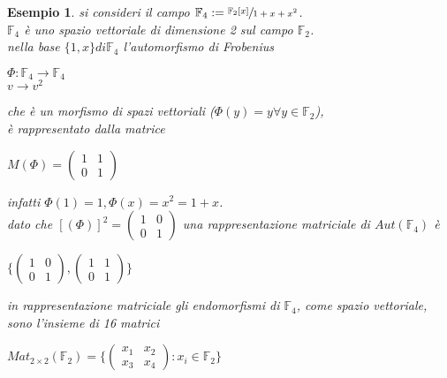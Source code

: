 \documentclass[a4paper,12pt]{article}
\theoremstyle{def}
\theoremstyle{prop}
\theoremstyle{esempio}
\newtheorem*{example}{Esempio}
\theoremstyle{dimostrazione}
\theoremstyle{teo}
\theoremstyle{osservazione}
\begin{document}
\newpage
\begin{example}
	si consideri il campo \(\mathbb{F}_4 := \sfrac{\mathbb{F}_2[x]}{1 + x + x^2}\).\\
	\(\mathbb{F}_4\) è uno spazio vettoriale di dimensione 2 sul campo \(\mathbb{F}_2\).\\
	nella base \(\{1, x\} di \mathbb{F}_4\) l'automorfismo di Frobenius
	\begin{center}
		\(\Phi : \mathbb{F}_4 \rightarrow \mathbb{F}_4\)\\
		\(v \rightarrow v^2\)
	\end{center}
	che è un morfismo di spazi vettoriali (\(\Phi(y) = y \forall y \in \mathbb{F}_2\)),\\
	è rappresentato dalla matrice
	\begin{center}
		\(M(\Phi) = \begin{pmatrix}
			1 & 1 \\
			0 & 1
		\end{pmatrix}\)
	\end{center}
	infatti \(\Phi(1) = 1, \Phi(x) = x^2 = 1 + x\).\\
	dato che \([(\Phi)]^2 = \begin{pmatrix}
		1 & 0 \\
		0 & 1
	\end{pmatrix}\) una rappresentazione matriciale di \(Aut(\mathbb{F}_4)\) è\\
	\begin{center}
		\(\{\begin{pmatrix}
			1 & 0 \\
			0 & 1
		\end{pmatrix},
		\begin{pmatrix}
			1 & 1 \\
			0 & 1
		\end{pmatrix}\}\)
	\end{center}
	in rappresentazione matriciale gli endomorfismi di \(\mathbb{F}_4\), come spazio vettoriale,\\
	sono l'insieme di 16 matrici
	\begin{center}
		\(Mat_{2 \times 2}(\mathbb{F}_2) = \{
		\begin{pmatrix}
			x_1 & x_2 \\
			x_3 & x_4
		\end{pmatrix} :
		x_i \in \mathbb{F}_2\}\)
	\end{center}
\end{example}
\end{document}

